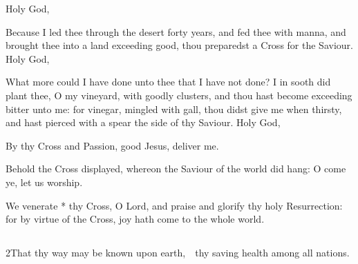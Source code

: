 \centerline{}


 Holy God, \etc


\medskip
\centerline{}

\V Because I led thee through the desert forty years, and fed thee with manna, and brought thee into a land exceeding good, thou preparedst a Cross for the Saviour.  Holy God, \etc

\medskip
\centerline{}

\V What more could I have done unto thee that I have not done? I in sooth did plant thee, O my vineyard, with goodly clusters, and thou hast become exceeding bitter unto me: for vinegar, mingled with gall, thou didst give me when thirsty, and hast pierced with a spear the side of thy Saviour.  Holy God, \etc

\medskip
{}
By thy Cross and Passion, good Jesus, deliver me.

\medskip
{}

 Behold the Cross displayed, whereon the Saviour of the world did hang: O come ye, let us worship.


 We venerate * thy Cross, O Lord, and praise and glorify thy holy Resurrection: for by virtue of the Cross, joy hath come to the whole world.

\subsection[{Psalm 67}]{}

\centerline{}

2\enspace That thy way may be known upon earth,\ \star\ thy saving health among all nations.

